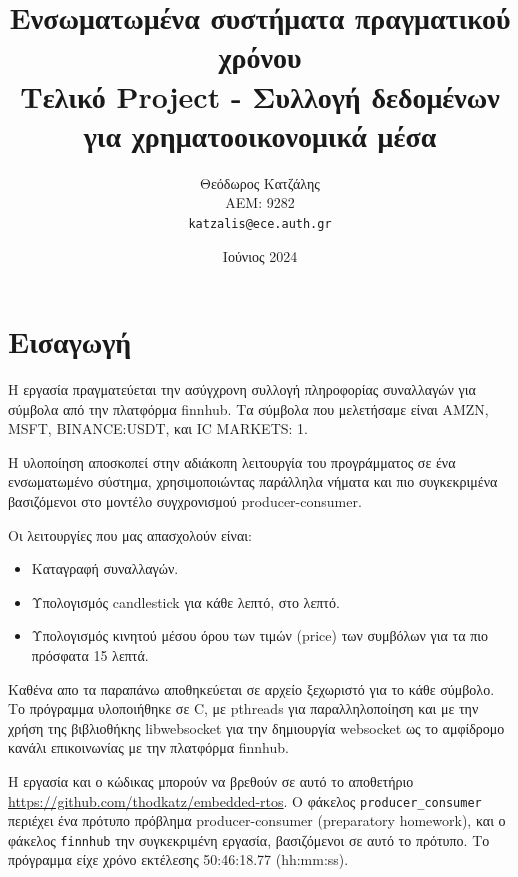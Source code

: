 \documentclass[12pt, a4paper]{article}
\title{\textbf{Ενσωματωμένα συστήματα πραγματικού χρόνου \\ \vspace{0.5cm} \normalsize{Τελικό Project - Συλλογή δεδομένων για χρηματοοικονομικά μέσα}}}
\author{
  Θεόδωρος Κατζάλης \\
  ΑΕΜ: 9282 \\
  \texttt{katzalis@ece.auth.gr}
}
\date{Ιούνιος 2024}
\begin{document}
\sloppy
%

\maketitle




\section{Εισαγωγή}

Η εργασία πραγματεύεται την ασύγχρονη συλλογή πληροφορίας συναλλαγών για σύμβολα από την πλατφόρμα finnhub. Τα σύμβολα που μελετήσαμε είναι AMZN, MSFT, BINANCE:USDT, και IC MARKETS: 1.

Η υλοποίηση αποσκοπεί στην αδιάκοπη λειτουργία του προγράμματος σε ένα ενσωματωμένο σύστημα, χρησιμοποιώντας παράλληλα νήματα και πιο συγκεκριμένα βασιζόμενοι στο μοντέλο συγχρονισμού producer-consumer.

Οι λειτουργίες που μας απασχολούν είναι:

\vspace{-1em}
\begin{itemize}
  \itemsep 0em
  \item Καταγραφή συναλλαγών.
  \item Υπολογισμός candlestick για κάθε λεπτό, στο λεπτό.
  \item Υπολογισμός κινητού μέσου όρου των τιμών (price) των συμβόλων για τα πιο πρόσφατα 15 λεπτά.
\end{itemize}
  
Καθένα απο τα παραπάνω αποθηκεύεται σε αρχείο ξεχωριστό για το κάθε σύμβολο. Το πρόγραμμα υλοποιήθηκε σε C, με pthreads για παραλληλοποίηση και με την χρήση της βιβλιοθήκης libwebsocket για την δημιουργία websocket ως το αμφίδρομο κανάλι επικοινωνίας με την πλατφόρμα finnhub.

Η εργασία και ο κώδικας μπορούν να βρεθούν σε αυτό το αποθετήριο \url{https://github.com/thodkatz/embedded-rtos}. Ο φάκελος \verb|producer_consumer| περιέχει ένα πρότυπο πρόβλημα producer-consumer (preparatory homework), και ο φάκελος \verb|finnhub| την συγκεκριμένη εργασία, βασιζόμενοι σε αυτό το πρότυπο. Το πρόγραμμα είχε χρόνο εκτέλεσης 50:46:18.77 (hh:mm:ss).
\end{document}
